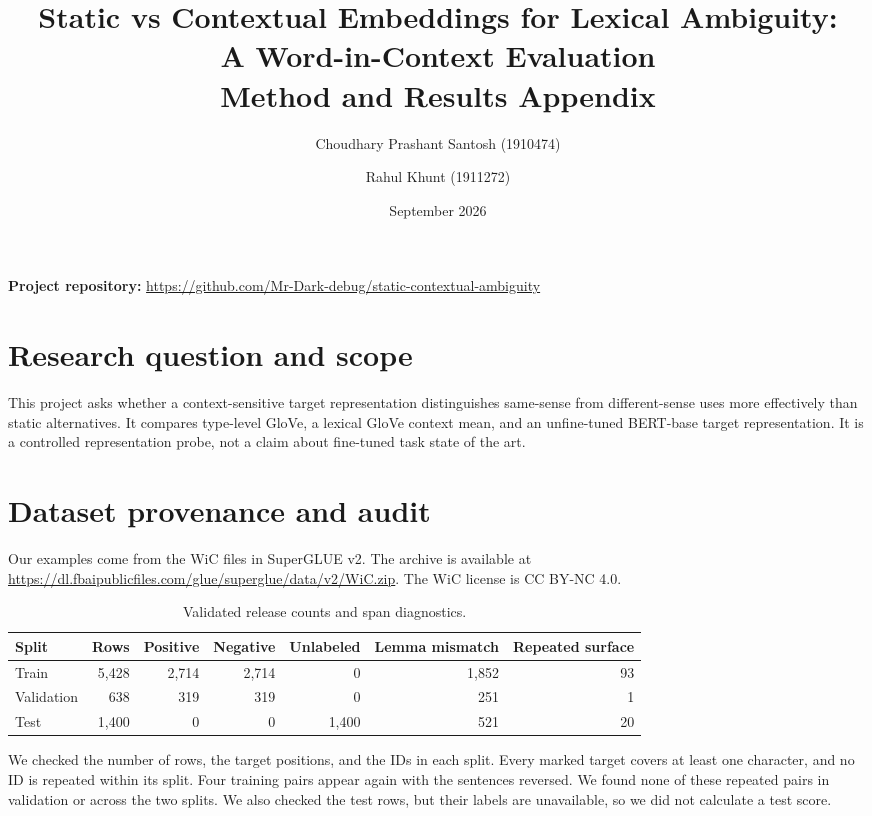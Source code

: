 \documentclass[11pt]{article}
\title{Static vs Contextual Embeddings for Lexical Ambiguity:\\
A Word-in-Context Evaluation\\Method and Results Appendix}
\author{Choudhary Prashant Santosh (1910474) \and Rahul Khunt (1911272)}
\date{September 2026}
\begin{document}
\maketitle
\tableofcontents

\vspace{1.25em}
\noindent\textbf{Project repository:} \url{https://github.com/Mr-Dark-debug/static-contextual-ambiguity}

\clearpage
\section{Research question and scope}
This project asks whether a context-sensitive target representation distinguishes
same-sense from different-sense uses more effectively than static alternatives.
It compares type-level GloVe, a lexical GloVe context mean, and an unfine-tuned
BERT-base target representation. It is a controlled representation probe, not a
claim about fine-tuned task state of the art.

\section{Dataset provenance and audit}
Our examples come from the WiC files in SuperGLUE v2. The archive is available
at \url{https://dl.fbaipublicfiles.com/glue/superglue/data/v2/WiC.zip}.
The WiC license is CC BY-NC 4.0.

\begin{table}[h]
\centering
\caption{Validated release counts and span diagnostics.}
\begin{tabular}{lrrrrrr}
\toprule
Split & Rows & Positive & Negative & Unlabeled & Lemma mismatch & Repeated surface \\
\midrule
Train & 5,428 & 2,714 & 2,714 & 0 & 1,852 & 93 \\
Validation & 638 & 319 & 319 & 0 & 251 & 1 \\
Test & 1,400 & 0 & 0 & 1,400 & 521 & 20 \\
\bottomrule
\end{tabular}
\end{table}

We checked the number of rows, the target positions, and the IDs in each split.
Every marked target covers at least one character, and no ID is repeated within
its split. Four training pairs appear again with the sentences reversed. We
found none of these repeated pairs in validation or across the two splits. We
also checked the test rows, but their labels are unavailable, so we did not
calculate a test score.
\end{document}
